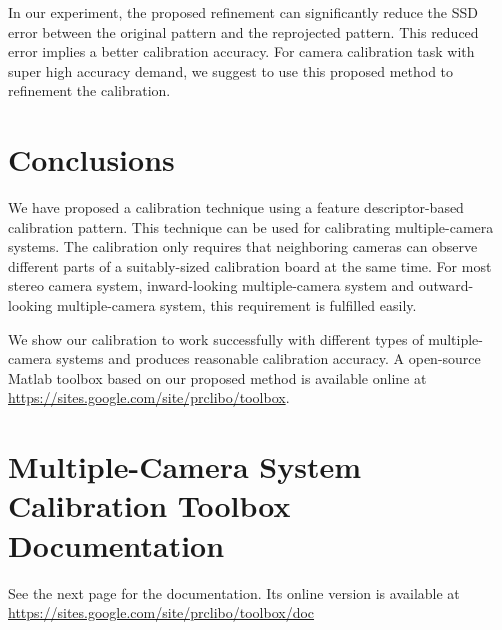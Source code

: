 \documentclass{report}
\begin{document}
\bigskip
In our experiment, the proposed refinement can significantly reduce the SSD error between the original pattern and the reprojected pattern. This reduced error implies a better calibration accuracy. For camera calibration task with super high accuracy demand, we suggest to use this proposed method to refinement the calibration. 



\chapter{Conclusions}
We have proposed a calibration technique using a feature descriptor-based calibration pattern. This technique can be used for calibrating multiple-camera systems. The calibration only requires that neighboring cameras can observe different parts of a suitably-sized calibration board at the same time. For most stereo camera system, inward-looking multiple-camera system and outward-looking multiple-camera system, this requirement is fulfilled easily. 

We show our calibration to work successfully with different types of multiple-camera systems and produces reasonable calibration accuracy. A open-source Matlab toolbox based on our proposed method is available online at {\small{\url{https://sites.google.com/site/prclibo/toolbox}}}. 


\appendix
\chapter{Multiple-Camera System Calibration Toolbox Documentation}

See the next page for the documentation. Its online version is available at {\small{\url{https://sites.google.com/site/prclibo/toolbox/doc}}}




\end{document}
